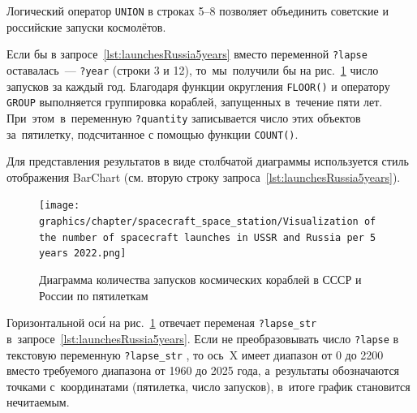 Логический оператор \lstinline|UNION| в строках 5--8 
позволяет объединить советские и российские запуски космолётов. 

Если бы в запросе~\ref{lst:launchesRussia5years} 
вместо переменной \lstinline|?lapse| оставалась~--- \lstinline|?year| (строки 3 и 12), 
то~мы~получили бы на рис.~\ref{fig:launchesRussia5years} 
число запусков за каждый год. 
Благодаря функции округления \mbox{\lstinline|FLOOR()|} 
и оператору \lstinline|GROUP| выполняется группировка%
%
 кораблей, запущенных в~течение пяти лет. 
При~этом~в~переменную \lstinline|?quantity| записывается число этих объектов за~пятилетку, 
подсчитанное с помощью функции \lstinline|COUNT()|.

Для представления результатов в виде столбчатой диаграммы используется стиль отображения BarChart 
(см. вторую строку запроса~\ref{lst:launchesRussia5years}).




\begin{figure}[h!]
    \texttt{[image: graphics/chapter/spacecraft\_space\_station/Visualization of the number of spacecraft launches in USSR and Russia per 5 years 2022.png]}
    \caption[График запусков космических кораблей в СССР и России, 2022 год.]{Диаграмма количества запусков космических кораблей в СССР и России по пятилеткам}%
    \label{fig:launchesRussia5years}%
\end{figure}



\newpage\phantom{blabla}

Горизонтальной ос\'{и} на рис.~\ref{fig:launchesRussia5years} 
отвечает переменая \mbox{\lstinline|?lapse_str|} в~запросе~\ref{lst:launchesRussia5years}. 
Если не преобразовывать число \lstinline|?lapse| 
в текстовую переменную \mbox{\lstinline|?lapse_str|}%
, то ось~X имеет диапазон от 0 до 2200 
вместо требуемого диапазона от 1960 до 2025 года, 
а~результаты обозначаются точками с~координатами (пятилетка, число запусков), 
в~итоге график становится нечитаемым. 

